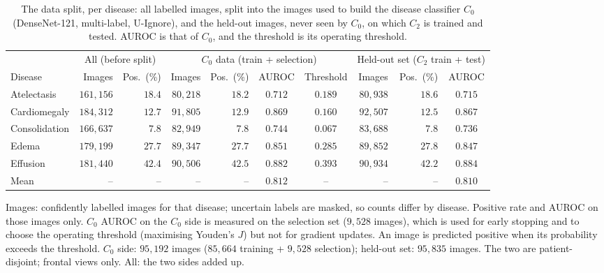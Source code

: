 \begin{table}[htbp]
\centering
\small
\caption{The data split, per disease: all labelled images, split into the images used to build the disease classifier $C_0$ (DenseNet-121, multi-label, U-Ignore), and the held-out images, never seen by $C_0$, on which $C_2$ is trained and tested. AUROC is that of $C_0$, and the threshold is its operating threshold.}
\label{tab:c0_split}
\begin{threeparttable}
\begin{tabular}{lrr|rrcc|rrc}
\toprule
& \multicolumn{2}{c|}{All (before split)} & \multicolumn{4}{c|}{$C_0$ data (train + selection)} & \multicolumn{3}{c}{Held-out set ($C_2$ train + test)} \\
\cmidrule(lr){2-3} \cmidrule(lr){4-7} \cmidrule(l){8-10}
Disease & Images & Pos.\ (\%) & Images & Pos.\ (\%) & AUROC & Threshold & Images & Pos.\ (\%) & AUROC \\
\midrule
Atelectasis & $161{,}156$ & $18.4$ & $80{,}218$ & $18.2$ & $0.712$ & $0.189$ & $80{,}938$ & $18.6$ & $0.715$ \\
Cardiomegaly & $184{,}312$ & $12.7$ & $91{,}805$ & $12.9$ & $0.869$ & $0.160$ & $92{,}507$ & $12.5$ & $0.867$ \\
Consolidation & $166{,}637$ & $7.8$ & $82{,}949$ & $7.8$ & $0.744$ & $0.067$ & $83{,}688$ & $7.8$ & $0.736$ \\
Edema & $179{,}199$ & $27.7$ & $89{,}347$ & $27.7$ & $0.851$ & $0.285$ & $89{,}852$ & $27.8$ & $0.847$ \\
Effusion & $181{,}440$ & $42.4$ & $90{,}506$ & $42.5$ & $0.882$ & $0.393$ & $90{,}934$ & $42.2$ & $0.884$ \\
\midrule
Mean & -- & -- & -- & -- & $0.812$ & -- & -- & -- & $0.810$ \\
\bottomrule
\end{tabular}
\begin{tablenotes}\footnotesize
\item Images: confidently labelled images for that disease; uncertain labels are masked, so counts differ by disease. Positive rate and AUROC on those images only. $C_0$ AUROC on the $C_0$ side is measured on the selection set ($9{,}528$ images), which is used for early stopping and to choose the operating threshold (maximising Youden's $J$) but not for gradient updates. An image is predicted positive when its probability exceeds the threshold. $C_0$ side: $95{,}192$ images ($85{,}664$ training + $9{,}528$ selection); held-out set: $95{,}835$ images. The two are patient-disjoint; frontal views only. All: the two sides added up.
\end{tablenotes}
\end{threeparttable}
\end{table}
